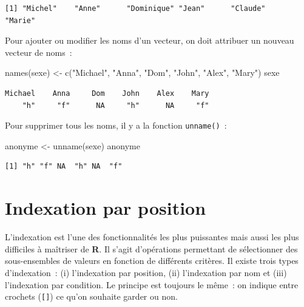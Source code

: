 \documentclass[
  letterpaper,
  DIV=11,
  numbers=noendperiod,
  oneside]{scrreprt}
\newenvironment{Shaded}{\begin{snugshade}}{\end{snugshade}}
\newcommand{\FunctionTok}[1]{\textcolor[rgb]{0.28,0.35,0.67}{#1}}
\newcommand{\NormalTok}[1]{\textcolor[rgb]{0.00,0.23,0.31}{#1}}
\newcommand{\OtherTok}[1]{\textcolor[rgb]{0.00,0.23,0.31}{#1}}
\newcommand{\StringTok}[1]{\textcolor[rgb]{0.13,0.47,0.30}{#1}}
\begin{document}
\begin{verbatim}
[1] "Michel"    "Anne"      "Dominique" "Jean"      "Claude"    "Marie"    
\end{verbatim}

Pour ajouter ou modifier les noms d'un vecteur, on doit attribuer un
nouveau vecteur de noms~:

\begin{Shaded}
\begin{Highlighting}[]
\FunctionTok{names}\NormalTok{(sexe) }\OtherTok{\textless{}{-}} \FunctionTok{c}\NormalTok{(}\StringTok{"Michael"}\NormalTok{, }\StringTok{"Anna"}\NormalTok{, }\StringTok{"Dom"}\NormalTok{, }\StringTok{"John"}\NormalTok{, }\StringTok{"Alex"}\NormalTok{, }\StringTok{"Mary"}\NormalTok{)}
\NormalTok{sexe}
\end{Highlighting}
\end{Shaded}

\begin{verbatim}
Michael    Anna     Dom    John    Alex    Mary 
    "h"     "f"      NA     "h"      NA     "f" 
\end{verbatim}

Pour supprimer tous les noms, il y a la fonction \texttt{unname()}~:

\begin{Shaded}
\begin{Highlighting}[]
\NormalTok{anonyme }\OtherTok{\textless{}{-}} \FunctionTok{unname}\NormalTok{(sexe)}
\NormalTok{anonyme}
\end{Highlighting}
\end{Shaded}

\begin{verbatim}
[1] "h" "f" NA  "h" NA  "f"
\end{verbatim}

\hypertarget{indexation-par-position}{%
\section{Indexation par position}\label{indexation-par-position}}

L'indexation est l'une des fonctionnalités les plus puissantes mais
aussi les plus difficiles à maîtriser de \textbf{R}. Il s'agit
d'opérations permettant de sélectionner des sous-ensembles de valeurs en
fonction de différents critères. Il existe trois types d'indexation~:
(i) l'indexation par position, (ii) l'indexation par nom et (iii)
l'indexation par condition. Le principe est toujours le même~: on
indique entre crochets (\texttt{{[}{]}}) ce qu'on souhaite garder ou non.
\end{document}
